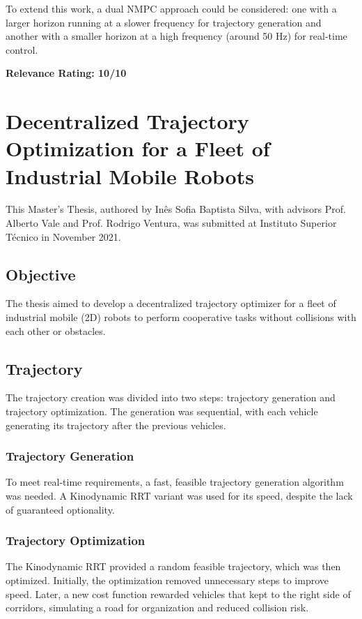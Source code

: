 \documentclass[a4paper,12pt]{article}
\begin{document}
To extend this work, a dual NMPC approach could be considered: one with a
larger horizon running at a slower frequency for trajectory generation and
another with a smaller horizon at a high frequency (around 50 Hz) for real-time
control.

\textbf{Relevance Rating: 10/10}

\section{Decentralized Trajectory Optimization for a Fleet of Industrial Mobile Robots}\label{sec:Ines_Silva_Thesis_Decentralized_Trajectory_Optimization}
This Master's Thesis, authored by Inês Sofia Baptista Silva, with advisors
Prof. Alberto Vale and Prof. Rodrigo Ventura, was submitted at Instituto
Superior Técnico in November 2021.

\subsection{Objective}
The thesis aimed to develop a decentralized trajectory optimizer for a fleet of
industrial mobile (2D) robots to perform cooperative tasks without collisions
with each other or obstacles.

\subsection{Trajectory}
The trajectory creation was divided into two steps: trajectory generation and
trajectory optimization. The generation was sequential, with each vehicle
generating its trajectory after the previous vehicles.

\subsubsection{Trajectory Generation}
To meet real-time requirements, a fast, feasible trajectory generation
algorithm was needed. A Kinodynamic RRT variant was used for its speed, despite
the lack of guaranteed optionality.

\subsubsection{Trajectory Optimization}
The Kinodynamic RRT provided a random feasible trajectory, which was then
optimized. Initially, the optimization removed unnecessary steps to improve
speed. Later, a new cost function rewarded vehicles that kept to the right side
of corridors, simulating a road for organization and reduced collision risk.
\end{document}
